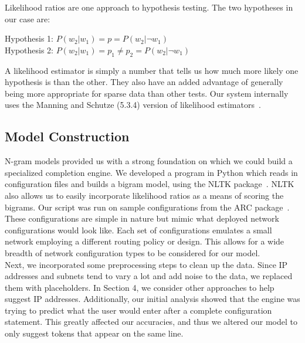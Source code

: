 Likelihood ratios are one approach to hypothesis testing. The two hypotheses in our case are:

\begin{center}
Hypothesis 1: $P(w_2|w_1) = p = P(w_2|\neg w_1)$ \\
Hypothesis 2: $P(w_2|w_1) = p_1 \neq p_2 = P(w_2|\neg w_1)$	\\	
\end{center}

A likelihood estimator is simply a number that tells us how much more likely one hypothesis is than the other. They also have an added advantage of generally being more appropriate for sparse data than other tests. Our system internally uses the Manning and Schutze (5.3.4) version of likelihood estimators~\cite{manning}.


\subsection{Model Construction}

N-gram models provided us with a strong foundation on which we could build a specialized completion engine. We developed a program in Python which reads in configuration files and builds a bigram model, using the NLTK package~\cite{nltk}. NLTK also allows us to easily incorporate likelihood ratios as a means of scoring the bigrams. Our script was run on sample configurations from the ARC package~\cite{arc}. These configurations are simple in nature but mimic what deployed network configurations would look like. Each set of configurations emulates a small network employing a different routing policy or design. This allows for a wide breadth of network configuration types to be considered for our model.\\ 

Next, we incorporated some preprocessing steps to clean up the data. Since IP addresses and subnets tend to vary a lot and add noise to the data, we replaced them with placeholders. In Section 4, we consider other approaches to help suggest IP addresses. Additionally, our initial analysis showed that the engine was trying to predict what the user would enter after a complete configuration statement. This greatly affected our accuracies, and thus we altered our model to only suggest tokens that appear on the same line.\\

